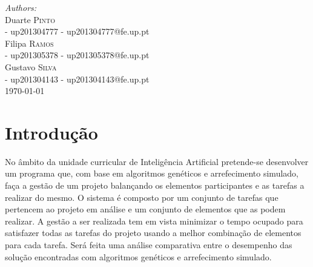 \begin{titlepage}


\Large \emph{Authors:}\\[0.5cm] \normalsize
Duarte \textsc{Pinto}\\[0.1cm] - up201304777 
- up201304777@fe.up.pt\\[0.1cm]
Filipa \textsc{Ramos}\\[0.1cm] - up201305378
- up201305378@fe.up.pt\\[0.1cm] 
Gustavo \textsc{Silva}\\[0.1cm] - up201304143
- up201304143@fe.up.pt\\[3cm] %


{\large \today}\\[0cm] %


\tableofcontents


\section{Introdução} 

\justify\normalsize
No âmbito da unidade curricular de Inteligência Artificial pretende-se desenvolver um programa que, com base em algoritmos genéticos e arrefecimento simulado, faça a gestão de um projeto balançando os elementos participantes e as tarefas a realizar do mesmo. O sistema é composto por um conjunto de tarefas que pertencem ao projeto em análise e um conjunto de elementos que as podem realizar. A gestão a ser realizada tem em vista minimizar o tempo ocupado para satisfazer todas as tarefas do projeto usando a melhor combinação de elementos para cada tarefa. Será feita uma análise comparativa entre o desempenho das solução encontradas com algoritmos genéticos e arrefecimento simulado. 


\end{titlepage}
